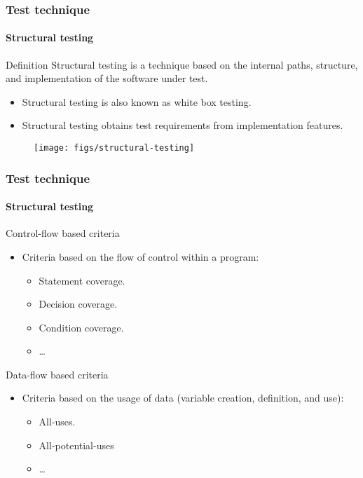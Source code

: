 \begin{frame}
\frametitle{Test technique}
\framesubtitle{Structural testing}

\begin{block:concept}{Definition}
Structural testing is a technique based on the internal paths, structure,
and implementation of the software under test.
\end{block:concept}


\begin{block:fact}{}
\begin{itemize}
	\item Structural testing is also known as white box testing.

	\item Structural testing obtains test requirements from implementation
	features.
\end{itemize}
\end{block:fact}

\begin{figure}
    \centering
    \texttt{[image: figs/structural-testing]}
\end{figure}
\end{frame}


\begin{frame}
\frametitle{Test technique}
\framesubtitle{Structural testing}
\label{concept:structural-testing-criteria}

\begin{block:fact}{Control-flow based criteria}
\begin{itemize}
	\item Criteria based on the flow of control within a program:
	\begin{itemize}
		\item Statement coverage.
		\item Decision coverage.
		\item Condition coverage.
		\item \ldots
	\end{itemize}
\end{itemize}
\end{block:fact}


\begin{block:fact}{Data-flow based criteria}
\begin{itemize}
	\item Criteria based on the usage of data (variable creation, definition,
	and use):
	\begin{itemize}
		\item All-uses.
		\item All-potential-uses
		\item \ldots
	\end{itemize}
\end{itemize}
\end{block:fact}


\hfill
{}
\end{frame}




